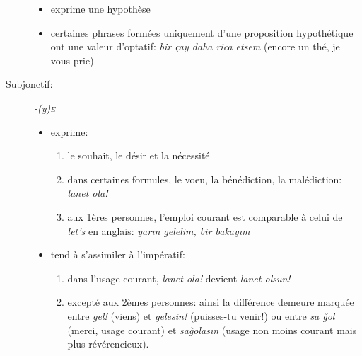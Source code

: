 \documentclass{cours}
\newcommand{\ug}{\u{g}}
\newcommand{\sce}{\textsc{e}}
\begin{document}
\begin{description}
          \begin{itemize}
              \item exprime une hypothèse
              \item certaines phrases formées uniquement d'une proposition hypothétique ont une valeur d'optatif: \textsl{bir çay daha rica etsem} (encore un thé, je vous prie)
          \end{itemize}
    \item [Subjonctif:] \textsl{-(y)\sce}
          \begin{itemize}
              \item exprime:
                    \begin{enumerate}
                        \item le souhait, le désir et la nécessité
                        \item dans certaines formules, le voeu, la bénédiction, la malédiction: \textsl{lanet ola!}
                        \item aux 1ères personnes, l'emploi courant est comparable à celui de \textsl{let's} en anglais: \textsl{yar\i n gelelim, bir bakay\i m}
                    \end{enumerate}
              \item tend à s'assimiler à l'impératif:
                    \begin{enumerate}
                        \item dans l'usage courant, \textsl{lanet ola!} devient \textsl{lanet olsun!}
                        \item excepté aux 2èmes personnes: ainsi la différence demeure marquée entre \textsl{gel!} (viens) et \textsl{gelesin!} (puisses-tu venir!) ou entre \textsl{sa \ug ol} (merci, usage courant) et \textsl{sa\ug olas\i n} (usage non moins courant mais plus révérencieux).
                    \end{enumerate}
          \end{itemize}
\end{description}
\end{document}
